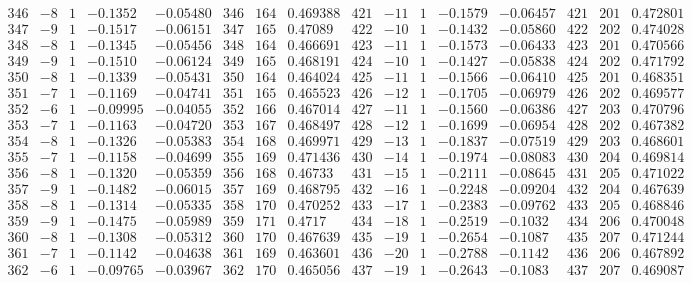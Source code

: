 \documentclass[11pt,reqno,a4letter]{article}
\numberwithin{figure}{section}
\numberwithin{table}{section}
\theoremstyle{plain}
\numberwithin{theorem}{section}
\theoremstyle{definition}
\begin{document}
\begin{table}[ht]
\begin{equation*}
{\begin{array}{ccccc|ccc|ccccc|ccc}
 346 & -8 & 1 & -0.1352 & -0.05480 & 346 & 164 & 0.469388 & 421 & -11 & 1 & -0.1579 & -0.06457 & 421 & 201 & 0.472801 \\
 347 & -9 & 1 & -0.1517 & -0.06151 & 347 & 165 & 0.47089 & 422 & -10 & 1 & -0.1432 & -0.05860 & 422 & 202 & 0.474028 \\
 348 & -8 & 1 & -0.1345 & -0.05456 & 348 & 164 & 0.466691 & 423 & -11 & 1 & -0.1573 & -0.06433 & 423 & 201 & 0.470566 \\
 349 & -9 & 1 & -0.1510 & -0.06124 & 349 & 165 & 0.468191 & 424 & -10 & 1 & -0.1427 & -0.05838 & 424 & 202 & 0.471792 \\
 350 & -8 & 1 & -0.1339 & -0.05431 & 350 & 164 & 0.464024 & 425 & -11 & 1 & -0.1566 & -0.06410 & 425 & 201 & 0.468351 \\
 351 & -7 & 1 & -0.1169 & -0.04741 & 351 & 165 & 0.465523 & 426 & -12 & 1 & -0.1705 & -0.06979 & 426 & 202 & 0.469577 \\
 352 & -6 & 1 & -0.09995 & -0.04055 & 352 & 166 & 0.467014 & 427 & -11 & 1 & -0.1560 & -0.06386 & 427 & 203 & 0.470796 \\
 353 & -7 & 1 & -0.1163 & -0.04720 & 353 & 167 & 0.468497 & 428 & -12 & 1 & -0.1699 & -0.06954 & 428 & 202 & 0.467382 \\
 354 & -8 & 1 & -0.1326 & -0.05383 & 354 & 168 & 0.469971 & 429 & -13 & 1 & -0.1837 & -0.07519 & 429 & 203 & 0.468601 \\
 355 & -7 & 1 & -0.1158 & -0.04699 & 355 & 169 & 0.471436 & 430 & -14 & 1 & -0.1974 & -0.08083 & 430 & 204 & 0.469814 \\
 356 & -8 & 1 & -0.1320 & -0.05359 & 356 & 168 & 0.46733 & 431 & -15 & 1 & -0.2111 & -0.08645 & 431 & 205 & 0.471022 \\
 357 & -9 & 1 & -0.1482 & -0.06015 & 357 & 169 & 0.468795 & 432 & -16 & 1 & -0.2248 & -0.09204 & 432 & 204 & 0.467639 \\
 358 & -8 & 1 & -0.1314 & -0.05335 & 358 & 170 & 0.470252 & 433 & -17 & 1 & -0.2383 & -0.09762 & 433 & 205 & 0.468846 \\
 359 & -9 & 1 & -0.1475 & -0.05989 & 359 & 171 & 0.4717 & 434 & -18 & 1 & -0.2519 & -0.1032 & 434 & 206 & 0.470048 \\
 360 & -8 & 1 & -0.1308 & -0.05312 & 360 & 170 & 0.467639 & 435 & -19 & 1 & -0.2654 & -0.1087 & 435 & 207 & 0.471244 \\
 361 & -7 & 1 & -0.1142 & -0.04638 & 361 & 169 & 0.463601 & 436 & -20 & 1 & -0.2788 & -0.1142 & 436 & 206 & 0.467892 \\
 362 & -6 & 1 & -0.09765 & -0.03967 & 362 & 170 & 0.465056 & 437 & -19 & 1 & -0.2643 & -0.1083 & 437 & 207 & 0.469087 \\

\end{array}}
\end{equation*}
\end{table}
\end{document}
